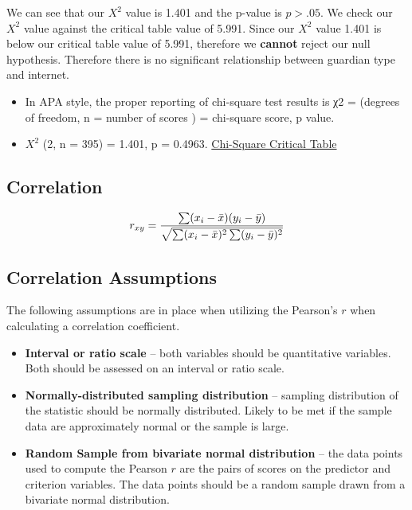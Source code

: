 \documentclass[
]{book}
\providecommand{\tightlist}{%
  \setlength{\itemsep}{0pt}\setlength{\parskip}{0pt}}
\theoremstyle{definition}
\theoremstyle{definition}
\theoremstyle{definition}
\theoremstyle{definition}
\theoremstyle{remark}
\begin{document}
We can see that our \(X^2\) value is 1.401 and the p-value is \(p>.05\). We check our \(X^2\) value against the critical table value of 5.991. Since our \(X^2\) value 1.401 is below our critical table value of 5.991, therefore we \textbf{cannot} reject our null hypothesis. Therefore there is no significant relationship between guardian type and internet.

\begin{itemize}
\tightlist
\item
  In APA style, the proper reporting of chi-square test results is χ2 = (degrees of freedom, n = number of scores ) = chi-square score, p value.
\item
  \(X^2\) (2, n = 395) = 1.401, p = 0.4963.
  \href{https://www.itl.nist.gov/div898/handbook/eda/section3/eda3674.htm}{Chi-Square Critical Table}
\end{itemize}

\hypertarget{correlation}{%
\subsection{Correlation}\label{correlation}}

\[\Large
r_{xy} = \frac{\sum(x_{i}-\bar{x})(y_{i}-\bar{y})}{\sqrt{\sum(x_{i}-\bar{x})^2\sum(y_{i}-\bar{y})^2}}\]

\hypertarget{correlation-assumptions}{%
\subsection{Correlation Assumptions}\label{correlation-assumptions}}

The following assumptions are in place when utilizing the Pearson's \(r\) when calculating a correlation coefficient.

\begin{itemize}
\tightlist
\item
  \textbf{Interval or ratio scale} -- both variables should be quantitative variables. Both should be assessed on an interval or ratio scale.
\item
  \textbf{Normally-distributed sampling distribution} -- sampling distribution of the statistic should be normally distributed. Likely to be met if the sample data are approximately normal or the sample is large.
\item
  \textbf{Random Sample from bivariate normal distribution} -- the data points used to compute the Pearson \(r\) are the pairs of scores on the predictor and criterion variables. The data points should be a random sample drawn from a bivariate normal distribution.
\end{itemize}
\end{document}
